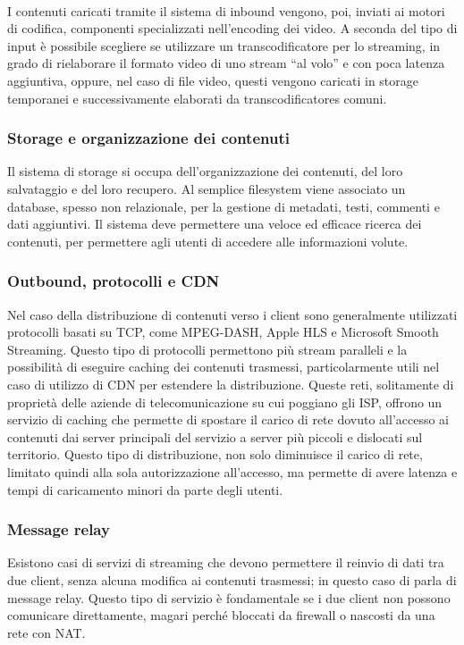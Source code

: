 			\paragraph*{}
			I contenuti caricati tramite il sistema di inbound vengono, poi, inviati ai motori di codifica, componenti specializzati nell'encoding dei video. A seconda del tipo di input è possibile scegliere se utilizzare un \gls{transcodificatore} per lo streaming, in grado di rielaborare il formato video di uno stream ``al volo'' e con poca latenza aggiuntiva, oppure, nel caso di file video, questi vengono caricati in storage temporanei e successivamente elaborati da \glspl{transcodificatore} comuni.

		\subsubsection{Storage e organizzazione dei contenuti}
			Il sistema di storage si occupa dell'organizzazione dei contenuti, del loro salvataggio e del loro recupero. Al semplice filesystem viene associato un database, spesso non relazionale, per la gestione di metadati, testi, commenti e dati aggiuntivi. Il sistema deve permettere una veloce ed efficace ricerca dei contenuti, per permettere agli utenti di accedere alle informazioni volute.

		\subsubsection{Outbound, protocolli e \gls{CDN}}
			Nel caso della distribuzione di contenuti verso i client sono generalmente utilizzati protocolli basati su TCP, come \gls{MPEG-DASH}, Apple \gls{HLS} e Microsoft Smooth Streaming. Questo tipo di protocolli permettono più stream paralleli e la possibilità di eseguire caching dei contenuti trasmessi, particolarmente utili nel caso di utilizzo di \gls{CDN} per estendere la distribuzione. Queste reti, solitamente di proprietà delle aziende di telecomunicazione su cui poggiano gli \gls{ISP}, offrono un servizio di caching che permette di spostare il carico di rete dovuto all'accesso ai contenuti dai server principali del servizio a server più piccoli e dislocati sul territorio. Questo tipo di distribuzione, non solo diminuisce il carico di rete, limitato quindi alla sola autorizzazione all'accesso, ma permette di avere latenza e tempi di caricamento minori da parte degli utenti.			

		\subsubsection{Message relay}
			Esistono casi di servizi di streaming che devono permettere il reinvio di dati tra due client, senza alcuna modifica ai contenuti trasmessi; in questo caso di parla di message relay. Questo tipo di servizio è fondamentale se i due client non possono comunicare direttamente, magari perché bloccati da firewall o nascosti da una rete con \gls{NAT}.\@

